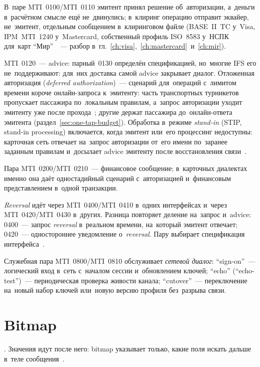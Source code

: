 В~паре MTI~0100/MTI~0110 эмитент принял решение об~авторизации, а~деньги
в~расчётном смысле ещё не~двинулись; в~клиринг операцию отправит эквайер,
не~эмитент, отдельным сообщением в~клиринговом файле (BASE~II~TC у~Visa,
  IPM~MTI~1240
  у~Mastercard, собственный профиль ISO~8583 у~НСПК для~карт \enquote{Мир}~\cite{azisova-mir-clearing-2022}~---
разбор в~гл.~\ref{ch:visa},~\ref{ch:mastercard}~и~\ref{ch:mir}).

MTI~0120~--- advice: парный~0130 определён спецификацией, но~многие IFS его
не~поддерживают: для~них доставка самой advice закрывает диалог. Отложенная
авторизация (\textit{deferred authorization})~--- сценарий для~операций
с~лимитом времени короче онлайн-запроса к~эмитенту: часть транспортных
турникетов пропускает пассажира по~локальным правилам, а~запрос авторизации
уходит эмитенту уже после прохода~\cite{uspf-transit-2018}; другие держат пассажира до~онлайн-ответа
эмитента (раздел~\ref{sec:one-tap-budget}). Обработка в~режиме \textit{stand-in}
(STIP, stand-in processing) включается, когда эмитент или~его процессинг
недоступны: карточная сеть отвечает на~запрос
авторизации от~его имени по~заранее заданным правилам и~досылает advice
эмитенту после восстановления связи~\cite{visa-stip-2020,visa-vip-system-overview-2005}.

Пара MTI~0200/MTI~0210~--- финансовое сообщение; в~карточных диалектах именно
она даёт одностадийный сценарий с~авторизацией и~финансовым представлением
в~одной транзакции.

\textit{Reversal} идёт через MTI~0400/\allowbreak MTI~0410 в~одних интерфейсах и~через
MTI~0420/\allowbreak MTI~0430 в~других. Разница повторяет деление на~запрос
и~advice: 0400~--- запрос \textit{reversal} в~реальном времени, на~который эмитент отвечает;
0420~--- одностороннее уведомление о~\textit{reversal}. Пару выбирает спецификация
интерфейса~\cite{fis-iso8583-guide-2023}.

Служебная пара MTI~0800/MTI~0810 обслуживает \emph{сетевой диалог}:
\enquote{sign-on}~--- логический вход в~сеть с~началом сессии и~обновлением
ключей; \enquote{echo} (\enquote{echo-test})~--- периодическая проверка живости
канала; \enquote{cutover}~--- переключение на~новый набор ключей или~новую
версию профиля без~разрыва связи.

\section{Bitmap}\label{sec:iso8583-bitmap}

. Значения идут
после него: bitmap указывает только, какие поля искать дальше в~теле
сообщения~\cite{fis-iso8583-guide-2023}.

